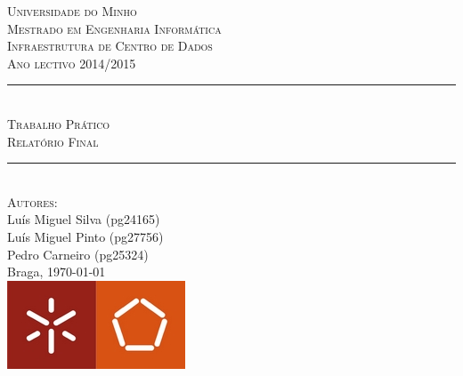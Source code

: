 \begin{titlepage}
\onehalfspacing
\newcommand{\HRule}{\rule{\linewidth}{0.5mm}} %
\center %
\textsc{\LARGE Universidade do Minho}\\[1.5cm] %
\textsc{\Large Mestrado em Engenharia Informática}\\[0.5cm] %
\textsc{\large Infraestrutura de Centro de Dados}\\[0.5cm] %
\textsc{Ano lectivo 2014/2015}\\[0.5cm]
\HRule \\[0.4cm]
\textsc{\Large Trabalho Prático}\\[0.4cm] %
\textsc{ \large Relatório Final}\\[0.4cm] %
\HRule \\[1.5cm]
\textsc{\large Autores:}\\
{
Luís Miguel Silva (pg24165) \\
Luís Miguel Pinto (pg27756) \\
Pedro Carneiro (pg25324)
}\\[1cm] %
Braga, {\large \today}\\[1cm] %
\includegraphics[scale=0.7]{img/escola-eng}\\[0cm] %
\vfill %
\end{titlepage}
